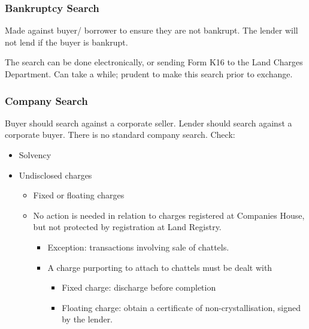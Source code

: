 \documentclass[
]{article}
\providecommand{\tightlist}{%
  \setlength{\itemsep}{0pt}\setlength{\parskip}{0pt}}
\begin{document}
\hypertarget{bankruptcy-search}{%
\subsubsection{Bankruptcy Search}\label{bankruptcy-search}}

Made against buyer/ borrower to ensure they are not bankrupt. The lender
will not lend if the buyer is bankrupt.

The search can be done electronically, or sending Form K16 to the Land
Charges Department. Can take a while; prudent to make this search prior
to exchange.

\hypertarget{company-search}{%
\subsubsection{Company Search}\label{company-search}}

Buyer should search against a corporate seller. Lender should search
against a corporate buyer. There is no standard company search. Check:

\begin{itemize}
\tightlist
\item
  Solvency
\item
  Undisclosed charges

  \begin{itemize}
  \tightlist
  \item
    Fixed or floating charges
  \item
    No action is needed in relation to charges registered at Companies
    House, but not protected by registration at Land Registry.

    \begin{itemize}
    \tightlist
    \item
      Exception: transactions involving sale of chattels.
    \item
      A charge purporting to attach to chattels must be dealt with

      \begin{itemize}
      \tightlist
      \item
        Fixed charge: discharge before completion
      \item
        Floating charge: obtain a certificate of non-crystallisation,
        signed by the lender.
      \end{itemize}
    \end{itemize}
  \end{itemize}
\end{itemize}
\end{document}

